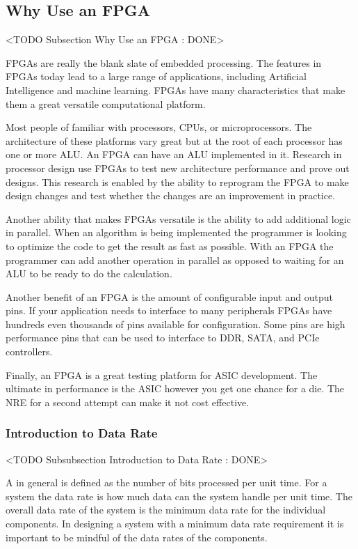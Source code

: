 \subsection{Why Use an FPGA}
	<TODO Subsection Why Use an FPGA : DONE>
	
\ac{FPGA}s are really the blank slate of embedded processing. The features in \ac{FPGA}s today lead to a large range of applications, including Artificial Intelligence and machine learning. \ac{FPGA}s have many characteristics that make them a great versatile computational platform. 

Most people of familiar with processors, \ac{CPU}s, or microprocessors. The architecture of these platforms vary great but at the root of each processor has one or more \ac{ALU}. An \ac{FPGA} can have an \ac{ALU} implemented in it. Research in processor design use \ac{FPGA}s to test new architecture performance and prove out designs. This research is enabled by the ability to reprogram the \ac{FPGA} to make design changes and test whether the changes are an improvement in practice. 

Another ability that makes \ac{FPGA}s versatile is the ability to add additional logic in parallel. When an algorithm is being implemented the programmer is looking to optimize the code to get the result as fast as possible. With an \ac{FPGA} the programmer can add another operation in parallel as opposed to waiting for an \ac{ALU} to be ready to do the calculation. 

Another benefit of an \ac{FPGA} is the amount of configurable input and output pins. If your application needs to interface to many peripherals \ac{FPGA}s have hundreds even thousands of pins available for configuration. Some pins are high performance pins that can be used to interface to \ac{DDR}, \ac{SATA}, and \ac{PCIe} controllers. 

Finally, an \ac{FPGA} is a great testing platform for \ac{ASIC} development. The ultimate in performance is the \ac{ASIC} however you get one chance for a die. The \ac{NRE} for a second attempt can make it not cost effective.

\subsubsection{Introduction to Data Rate}
	<TODO Subsubsection  Introduction to Data Rate : DONE>

A  in general is defined as the number of bits processed per unit time. For a system the data rate is how much data can the system handle per unit time. The overall data rate of the system is the minimum data rate for the individual components. In designing a system with a minimum data rate requirement it is important to be mindful of the data rates of the components.

